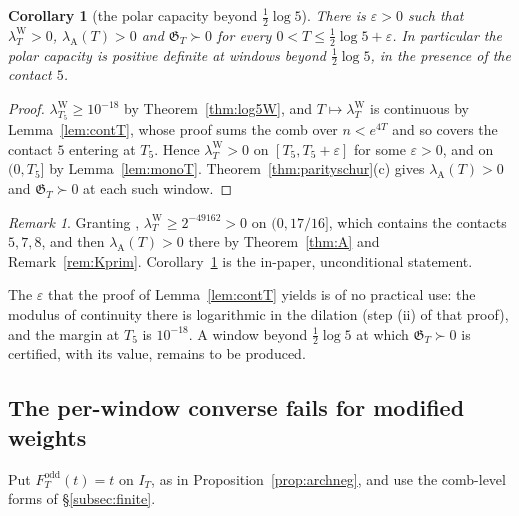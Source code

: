 \documentclass[11pt]{amsart}
\newtheorem{corollary}[theorem]{Corollary}
\theoremstyle{definition}
\theoremstyle{remark}
\newtheorem{remark}[theorem]{Remark}
\newcommand{\IT}{I_T}
\newcommand{\lamW}{\lambda^{\mathrm W}_T}
\newcommand{\lamA}{\lambda_{\mathrm A}(T)}
\begin{document}
\begin{corollary}[the polar capacity beyond $\frac12\log5$]\label{cor:beyond5}
There is $\varepsilon>0$ such that $\lamW>0$, $\lamA>0$ and $\mathfrak G_T\succ0$ for every
$0<T\le\frac12\log5+\varepsilon$. In particular the polar capacity is positive definite at windows beyond
$\frac12\log5$, in the presence of the contact $5$.
\end{corollary}
\begin{proof}
$\lambda^{\mathrm W}_{T_5}\ge10^{-18}$ by Theorem~\ref{thm:log5W}, and $T\mapsto\lamW$ is continuous by
Lemma~\ref{lem:contT}, whose proof sums the comb over $n<e^{4T}$ and so covers the contact $5$ entering at $T_5$.
Hence $\lamW>0$ on $[T_5,T_5+\varepsilon]$ for some $\varepsilon>0$, and on $(0,T_5]$ by Lemma~\ref{lem:monoT}.
Theorem~\ref{thm:parityschur}(c) gives $\lamA>0$ and $\mathfrak G_T\succ0$ at each such window.
\end{proof}
\begin{remark}\label{rem:liu}
Granting \cite[Thm.~B]{Liu2026}, $\lamW\ge2^{-49162}>0$ on $(0,17/16]$, which contains the contacts
$5,7,8$, and then $\lamA>0$ there by Theorem~\ref{thm:A} and Remark~\ref{rem:Kprim}. Corollary~\ref{cor:beyond5}
is the in-paper, unconditional statement.
\end{remark}
The $\varepsilon$ that the proof of Lemma~\ref{lem:contT} yields is of no practical use: the modulus of continuity
there is logarithmic in the dilation (step (ii) of that proof), and the margin at $T_5$ is $10^{-18}$. A window
beyond $\frac12\log5$ at which $\mathfrak G_T\succ0$ is certified, with its value, remains to be produced.


\subsection{The per-window converse fails for modified weights}
Put $F^{\mathrm{odd}}_T(t)=t$ on $\IT$, as in Proposition~\ref{prop:archneg}, and use the comb-level forms of \S\ref{subsec:finite}.
\end{document}
